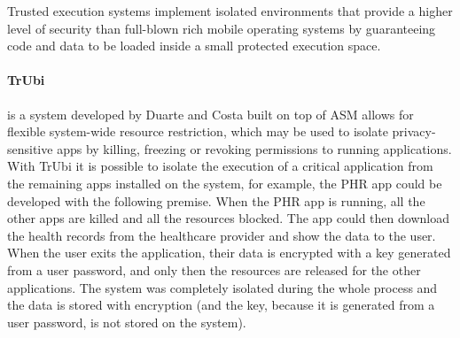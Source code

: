 
Trusted execution systems implement isolated environments that provide a higher level of security than full-blown rich mobile operating systems by guaranteeing code and data to be loaded inside a small protected execution space.


\paragraph{\textbf{TrUbi}} is a system developed by Duarte \cite{nunoduarte} and Costa \cite{miguelcosta} built on top of ASM \cite{heuser2014asm} allows for flexible system-wide resource restriction, which may be used to isolate privacy-sensitive apps by killing, freezing or revoking permissions to running applications. With TrUbi it is possible to isolate the execution of a critical application from the remaining apps installed on the system, for example, the \ac{PHR} app could be developed with the following premise.
When the \ac{PHR} app is running, all the other apps are killed and all the resources blocked. The app could then download the health records from the healthcare provider and show the data to the user. When the user exits the application, their data is encrypted with a key generated from a user password, and only then the resources are released for the other applications. The system was completely isolated during the whole process and the data is stored with encryption (and the key, because it is generated from a user password, is not stored on the system).


